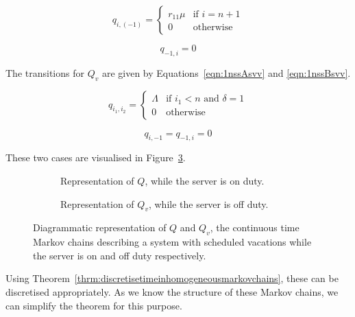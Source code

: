 \documentclass{article}
\begin{document}
\begin{equation}\label{eqn:1nssBsv}
  q_{i, (-1)} = \left\{
  \begin{array}{rr}
    r_{11}\mu & \text{if } i = n + 1 \\
    0 & \text{otherwise}
  \end{array}
  \right.
\end{equation}

\begin{equation}\label{eqn:1nssCsv}
  q_{-1, i} = 0
\end{equation}

The transitions for $Q_v$ are given by Equations~\ref{eqn:1nssAsvv} and \ref{eqn:1nssBsvv}.

\begin{equation}\label{eqn:1nssAsvv}
  q_{i_1, i_2} = \left\{
  \begin{array}{rr}
      \Lambda & \text{if } i_1 < n \text{ and } \delta = 1 \\
      0 & \text{otherwise}
  \end{array} \right.
\end{equation}

\begin{equation}\label{eqn:1nssBsvv}
  q_{i, -1} = q_{-1, i} = 0
\end{equation}

These two cases are visualised in Figure~\ref{fig:scheduledvacationsMC}.

\begin{figure}[!hbtp]
\begin{subfigure}[b]{\textwidth}
    
    \caption{Representation of $Q$, while the server is on duty.}
    \vspace{3cm}
    \label{fig:MCSVonduty}
\end{subfigure}
\begin{subfigure}[b]{\textwidth}
    
    \caption{Representation of $Q_v$, while the server is off duty.}
    \label{fig:MCSVoffduty}
\end{subfigure}
\caption{Diagrammatic representation of $Q$ and $Q_v$, the continuous time Markov chains describing a system with scheduled vacations while the server is on and off duty respectively.}
\label{fig:scheduledvacationsMC}
\end{figure}




Using Theorem~\ref{thrm:discretisetimeinhomogeneousmarkovchains}, these can be discretised appropriately.
As we know the structure of these Markov chains, we can simplify the theorem for this purpose.
\newline
\end{document}
